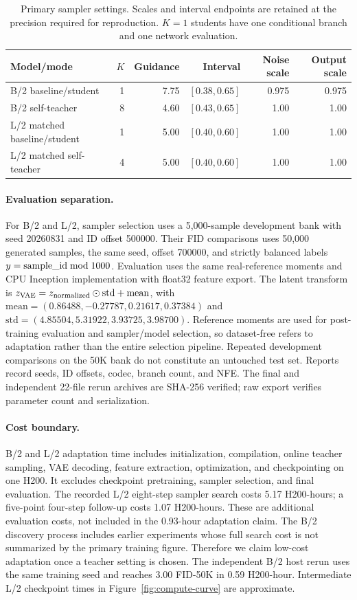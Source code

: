 \begin{table}[!b]
\centering
\caption{Primary sampler settings. Scales and interval endpoints are retained
at the precision required for reproduction. $K=1$ students have one
conditional branch and one network evaluation.}
\label{tab:sampler-settings}
\begin{tabular}{lrrrrr}
\toprule
Model/mode & $K$ & Guidance & Interval & Noise scale & Output scale \\
\midrule
B/2 baseline/student & 1 & 7.75 & $[0.38,0.65]$ & 0.975 & 0.975 \\
B/2 self-teacher & 8 & 4.60 & $[0.43,0.65]$ & 1.00 & 1.00 \\
L/2 matched baseline/student & 1 & 5.00 & $[0.40,0.60]$ & 1.00 & 1.00 \\
L/2 matched self-teacher & 4 & 5.00 & $[0.40,0.60]$ & 1.00 & 1.00 \\
\bottomrule
\end{tabular}
\end{table}

\paragraph{Evaluation separation.}
For B/2 and L/2, sampler selection uses a 5,000-sample development bank with seed 20260831
and ID offset 500000. Their FID comparisons
uses 50,000 generated samples, the same seed, offset 700000, and strictly
balanced labels $y={\rm sample\_id}\bmod1000$. Evaluation uses the same
real-reference moments and CPU Inception implementation with float32 feature
export. The latent transform is
$z_{\rm VAE}=z_{\rm normalized}\odot\mathrm{std}+\mathrm{mean}$, with
$\mathrm{mean}=(0.86488,-0.27787,0.21617,0.37384)$ and
$\mathrm{std}=(4.85504,5.31922,3.93725,3.98700)$.
Reference moments are used for post-training evaluation and sampler/model
selection, so dataset-free refers to adaptation rather than the entire
selection pipeline. Repeated development comparisons on the 50K bank do not
constitute an untouched test set. Reports record seeds, ID offsets, codec,
branch count, and NFE. The final and independent 22-file rerun archives are
SHA-256 verified; raw export verifies parameter count and serialization.

\paragraph{Cost boundary.}
B/2 and L/2 adaptation time includes initialization, compilation, online teacher sampling,
VAE decoding, feature extraction, optimization, and checkpointing on one H200. It excludes
checkpoint pretraining, sampler selection, and final evaluation. The recorded
L/2 eight-step sampler search costs 5.17 H200-hours; a five-point four-step
follow-up costs 1.07 H200-hours. These are additional evaluation costs,
not included in the 0.93-hour adaptation claim. The B/2 discovery process
includes earlier experiments whose full search cost is not summarized by
the primary training figure. Therefore we claim low-cost adaptation once a
teacher setting is chosen.
The independent B/2 host rerun uses the same training seed and reaches
3.00 FID-50K in 0.59 H200-hour. Intermediate L/2 checkpoint times in
Figure~\ref{fig:compute-curve} are approximate.

